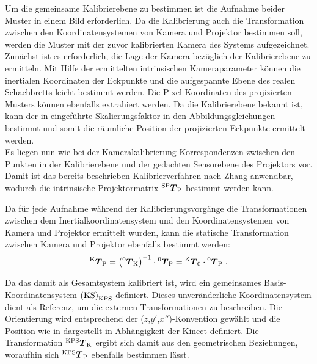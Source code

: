\prever{
}

Um die gemeinsame Kalibrierebene zu bestimmen ist die Aufnahme beider Muster in einem Bild erforderlich. Da die Kalibrierung auch die Transformation zwischen den Koordinatensystemen von Kamera und Projektor bestimmen soll, werden die Muster mit der zuvor kalibrierten Kamera des Systems aufgezeichnet.\\

Zunächst ist es erforderlich, die Lage der Kamera bezüglich der Kalibrierebene zu ermitteln. Mit Hilfe der ermittelten intrinsischen Kameraparameter können die inertialen Koordinaten der Eckpunkte und die aufgespannte Ebene des realen Schachbretts leicht bestimmt werden. Die Pixel-Koordinaten des projizierten Musters können ebenfalls extrahiert werden. Da die Kalibrierebene bekannt ist, kann der in  eingeführte Skalierungsfaktor in den Abbildungsgleichungen bestimmt und somit die räumliche Position der projizierten Eckpunkte ermittelt werden.\\

Es liegen nun wie bei der Kamerakalibrierung Korrespondenzen zwischen den Punkten in der Kalibrierebene und der gedachten Sensorebene des Projektors vor. Damit ist das bereits beschrieben Kalibrierverfahren nach Zhang anwendbar, wodurch die intrinsische Projektormatrix ${^{\mathrm{SP}}\mbox{\boldmath{$T$}}_{\mathrm{P}}}$ bestimmt werden kann.\\

\prever{
}

Da für jede Aufnahme während der Kalibrierungsvorgänge die Transformationen zwischen dem Inertialkoordinatensystem und den Koordinatensystemen von Kamera und Projektor ermittelt wurden, kann die statische Transformation zwischen Kamera und Projektor ebenfalls bestimmt werden:
%
\begin{equation}
{^{\mathrm{K}}\mbox{\boldmath{$T$}}_{\mathrm{P}}} = \left( {^{\mathrm{0}}\mbox{\boldmath{$T$}}_{\mathrm{K}}} \right)^{-1} \cdot {^{\mathrm{0}}\mbox{\boldmath{$T$}}_{\mathrm{P}}} = {^{\mathrm{K}}\mbox{\boldmath{$T$}}_{\mathrm{0}}} \cdot {^{\mathrm{0}}\mbox{\boldmath{$T$}}_{\mathrm{P}}} \; \text{.}
\end{equation}

Da das \kps{} damit als Gesamtsystem kalibriert ist, wird ein gemeinsames Basis-Koordinatensystem ${\mathrm{(KS)}}_{\mathrm{KPS}}$ definiert. Dieses unveränderliche Koordinatensystem dient als Referenz, um die externen Transformationen zu beschreiben. Die Orientierung wird entsprechend der ($z$,$y'$,$x''$)-Konvention gewählt und die Position wie in  dargestellt in Abhängigkeit der Kinect definiert. Die Transformation ${^{\mathrm{KPS}}\mbox{\boldmath{$T$}}_{\mathrm{K}}}$ ergibt sich damit aus den geometrischen Beziehungen, woraufhin sich ${^{\mathrm{KPS}}\mbox{\boldmath{$T$}}_{\mathrm{P}}}$ ebenfalls bestimmen lässt.


